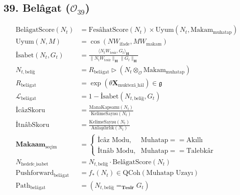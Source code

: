 \documentclass[11pt, a4paper]{article}
\begin{document}
\subsection{39. Belâgat ($\mathcal{O}_{39}$)}
\begin{align}
\text{BelâgatScore}(N_t) &= \text{FesâhatScore}(N_t) \times \text{Uyum}\left( N_t, \text{Makam}_{\text{muhatap}} \right) \\
\text{Uyum}(N, M) &= \cos(N W_{\text{ifade}}, M W_{\text{makam}}) \\
\text{İsabet}(N_t, G_t) &= \frac{\langle N_t W_{\text{tesir}}, G_t \rangle_{\mathbf{H}}}{\|N_t W_{\text{tesir}}\|_{\mathbf{H}} \|G_t\|_{\mathbf{H}}} \\
N_{t, \text{beliğ}} &= R_{\text{belâgat}} \triangleright (N_t \otimes_{\mathcal{O}} \text{Makam}_{\text{muhatap}}) \\
R_{\text{belâgat}} &= \exp\left( \theta \mathbf{X}_{\text{muktezâ\_hâl}} \right) \in \mathfrak{g} \\
\mathcal{L}_{\text{belâgat}} &= 1 - \text{İsabet}(N_{t, \text{beliğ}}, G_t) \\
\text{İcâzSkoru} &= \frac{\text{ManaKapsamı}(N_t)}{\text{KelimeSayısı}(N_t)} \\
\text{İtnâbSkoru} &= \frac{\text{KelimeSayısı}(N_t)}{\text{Anlaşılırlık}(N_t)} \\
\mathbf{Makaam}_{\text{seçim}} &= 
\begin{cases}
\text{İcâz Modu}, & \text{Muhatap} == \text{Akıllı} \\
\text{İtnâb Modu}, & \text{Muhatap} == \text{Talebkâr}
\end{cases} \\
N_{\text{hedefe\_isabet}} &= N_{t, \text{beliğ}} \cdot \text{BelâgatScore}(N_t) \\
\text{Pushforward}_{\text{belâgat}} &= f_*(N_t) \in \text{QCoh}(\text{Muhatap Uzayı}) \\
\text{Path}_{\text{belâgat}} &= (N_{t, \text{beliğ}} =_{\mathbf{Tesir}} G_t)
\end{align}
\end{document}
